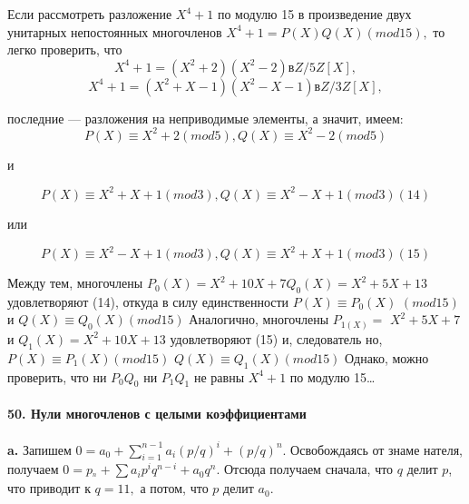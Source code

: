 \documentclass{../../template/mai_book}
\begin{document}
{{Если рассмотреть разложение $X^{4} + 1$ по модулю 15 в произведение двух\linebreak
унитарных непостоянных многочленов $X^{4} + 1 = P(X)Q(X) (mod 15),$\linebreak
то легко проверить, что
$$X^{4} + 1 = (X^{2} + 2 )(X^{2} - 2) в Z/5Z[X],$$
$$X^{4} + 1 = (X^{2} + X - 1 )(X^{2} - X - 1) в Z/3Z[X],$$

последние --- разложения на неприводимые элементы, а значит, имеем: 
$$P(X) \equiv X^{2} + 2 (mod 5), Q(X) \equiv X^{2} - 2 (mod 5)$$

и

$$P(X) \equiv X^{2} + X + 1 (mod 3), Q(X) \equiv X^{2} - X + 1 (mod 3)   (14)$$

или

$$P(X) \equiv X^{2} - X + 1 (mod 3), Q(X) \equiv X^{2} + X + 1 (mod 3)   (15)$$

Между тем, многочлены $P_{0}(X) = X^{2} + 10X + 7   Q_{0}(X) = X^{2} + 5X + 13$\linebreak
удовлетворяют (14), откуда в силу единственности $P(X) \equiv P_{0}(X)$\linebreak
$(mod 15)$ и $Q(X) \equiv Q_0(X) (mod 15)$ Аналогично, многочлены $P_{1(X)} =$\linebreak
$X^{2} + 5X + 7$ и $Q_{1}(X) = X^{2} + 10X + 13$ удовлетворяют (15) и, следователь­\linebreak
но,$P(X) \equiv P_{1}(X) (mod 15)$ $Q(X) \equiv Q_{1}(X) (mod 15)$ Однако, можно\linebreak
проверить, что ни $P_0Q_0$ ни $P_1Q_1$  не равны $X^{4} + 1$ по модулю 15\ldots\\
\\
\noindent\textbf{50. Нули многочленов с целыми коэффициентами}\\
\\
\hspace*{15pt}\textbf{a.}  Запишем $0 = a_0+\sum^{n-1}_{i=1}a_{i}(p/q)^{i} + (p/q)^{n}$. Освобождаясь от знаме­
нателя, получаем $0 = p_^{n}+\sum a_{i}p^{i}q^{n-i}+a_{0}q^{n}.$ Отсюда получаем сначала, 
что $q$ делит $p$, что приводит к $q = 11,$ а потом, что $p$ делит $a_0$.

}}
\end{document}
